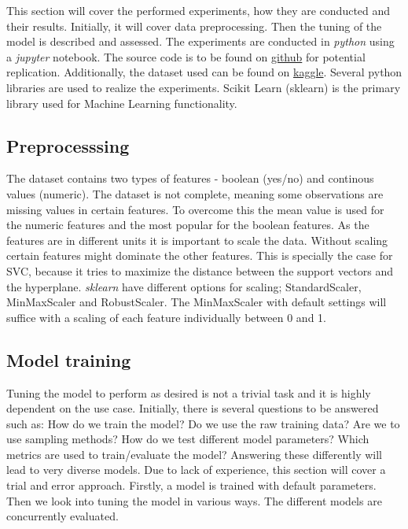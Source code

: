This section will cover the performed experiments, how they are conducted and their results. Initially, it will cover data preprocessing. Then the tuning of the model is described and assessed. The experiments are conducted in \textit{python} using a \textit{jupyter} notebook. The source code is to be found on \href{https://github.com/mlRosenquist/au-mlr-computer-vision-and-ml/tree/master/project/notebook.ipynb}{github} for potential replication. Additionally, the dataset used can be found on \href{https://www.kaggle.com/competitions/au-ece-cvml2022/data}{kaggle}. Several python libraries are used to realize the experiments. Scikit Learn (sklearn)\cite{scikit-learn} is the primary library used for Machine Learning functionality.         


\subsection{Preprocesssing}
The dataset contains two types of features - boolean (yes/no) and continous values (numeric). The dataset is not complete, meaning some observations are missing values in certain features. To overcome this the mean value is used for the numeric features and the most popular for the boolean features. As the features are in different units it is important to scale the data. Without scaling certain features might dominate the other features. This is specially the case for SVC, because it tries to maximize the distance between the support vectors and the hyperplane. \textit{sklearn} have different options for scaling; StandardScaler, MinMaxScaler and RobustScaler. The MinMaxScaler with default settings will suffice with a scaling of each feature individually between 0 and 1\cite{scikit-learn}.         

\subsection{Model training}
Tuning the model to perform as desired is not a trivial task and it is highly dependent on the use case. Initially, there is several questions to be answered such as: How do we train the model? Do we use the raw training data? Are we to use sampling methods? How do we test different model parameters? Which metrics are used to train/evaluate the model? Answering these differently will lead to very diverse models. Due to lack of experience, this section will cover a trial and error approach. Firstly, a model is trained with default parameters. Then we look into tuning the model in various ways. The different models are concurrently evaluated. \\

